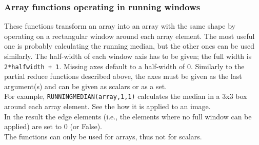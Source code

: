 \subsubsection{Array functions operating in running windows}
These functions transform an array into an array with the same shape
by operating on a rectangular window around each array element.
The most useful one is probably calculating the running median, but
the other ones can be used similarly.
The half-width of each window axis has to be given; the full width is
\texttt{2*halfwidth + 1}. Missing axes default to a half-width of 0.
Similarly to the partial reduce functions described above, the axes
must be given as the last argument(s) and can be given as scalars or as a set.
\\For example,
\texttt{RUNNINGMEDIAN(array,1,1)} calculates the median
in a 3x3 box around each array element.
See the  how it is applied to an image.
\\In the result the edge elements (i.e., the elements where no full
window can be applied) are set to 0 (or False).
\\The functions can only be used for arrays, thus not for scalars.
